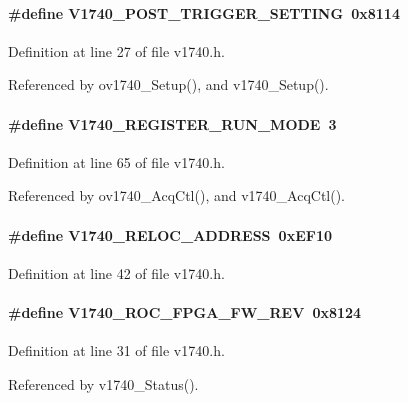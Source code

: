 \paragraph[{V1740\_\-POST\_\-TRIGGER\_\-SETTING}]{\setlength{\rightskip}{0pt plus 5cm}\#define V1740\_\-POST\_\-TRIGGER\_\-SETTING~0x8114}\hfill\label{v1740_8h_a71a09d8689e5bfd282412e076a16a3a0}


Definition at line 27 of file v1740.h.

Referenced by ov1740\_\-Setup(), and v1740\_\-Setup().
\paragraph[{V1740\_\-REGISTER\_\-RUN\_\-MODE}]{\setlength{\rightskip}{0pt plus 5cm}\#define V1740\_\-REGISTER\_\-RUN\_\-MODE~3}\hfill\label{v1740_8h_ad39b8ec2860d2ac0e640a4de0f07e42e}


Definition at line 65 of file v1740.h.

Referenced by ov1740\_\-AcqCtl(), and v1740\_\-AcqCtl().
\paragraph[{V1740\_\-RELOC\_\-ADDRESS}]{\setlength{\rightskip}{0pt plus 5cm}\#define V1740\_\-RELOC\_\-ADDRESS~0xEF10}\hfill\label{v1740_8h_a54087b95f162d4eccc9ec2c5a68c1ae7}


Definition at line 42 of file v1740.h.
\paragraph[{V1740\_\-ROC\_\-FPGA\_\-FW\_\-REV}]{\setlength{\rightskip}{0pt plus 5cm}\#define V1740\_\-ROC\_\-FPGA\_\-FW\_\-REV~0x8124}\hfill\label{v1740_8h_aaf6beffd0801b0966eaaddcd01d34bc9}


Definition at line 31 of file v1740.h.

Referenced by v1740\_\-Status().
